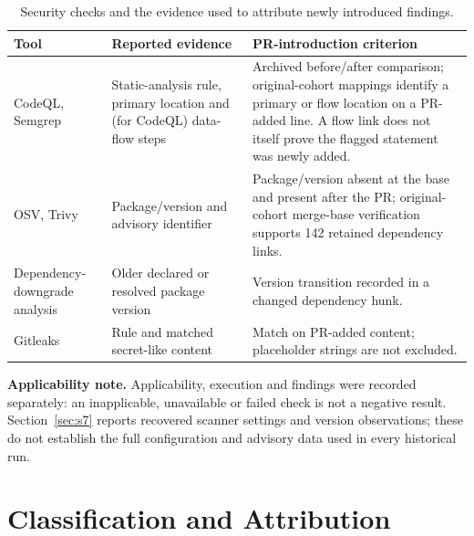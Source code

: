\begin{table}[H]
\caption{Security checks and the evidence used to attribute newly introduced findings.}
\label{tab:scanners}
\footnotesize\renewcommand{\arraystretch}{1.13}
\begin{tabularx}{\linewidth}{@{}L{2.5cm}L{3.25cm}Y@{}}
\toprule
\textbf{Tool} & \textbf{Reported evidence} & \textbf{PR-introduction criterion}\\
\midrule
CodeQL, Semgrep & Static-analysis rule, primary location and (for CodeQL) data-flow steps & Archived before/after comparison; original-cohort mappings identify a primary or flow location on a PR-added line. A flow link does not itself prove the flagged statement was newly added.\\
OSV, Trivy & Package/version and advisory identifier & Package/version absent at the base and present after the PR; original-cohort merge-base verification supports 142 retained dependency links.\\
Dependency-downgrade analysis & Older declared or resolved package version & Version transition recorded in a changed dependency hunk.\\
Gitleaks & Rule and matched secret-like content & Match on PR-added content; placeholder strings are not excluded.\\
\bottomrule
\end{tabularx}
\par\smallskip\raggedright\scriptsize
\textbf{Applicability note.} Applicability, execution and findings were recorded separately: an inapplicable, unavailable or failed check is not a negative result. Section~\ref{sec:s7} reports recovered scanner settings and version observations; these do not establish the full configuration and advisory data used in every historical run.
\end{table}

\FloatBarrier
\section{Classification and Attribution}\label{sec:s2}


